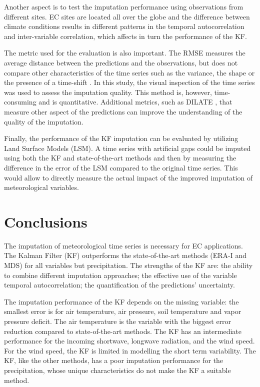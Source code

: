 \documentclass{article}
\let\Oldsection\section
\renewcommand{\section}{\FloatBarrier\Oldsection}
\begin{document}
Another aspect is to test the imputation performance using observations from different sites. EC sites are located all over the globe \cite{pastorello_fluxnet2015_2020} and the difference between climate conditions results in different patterns in the temporal autocorrelation and inter-variable correlation, which affects in turn the performance of the KF.

The metric used for the evaluation is also important. The RMSE measures the average distance between the predictions and the observations, but does not compare other characteristics of the time series such as the variance, the shape or the presence of a time-shift \cite{guen_shape_nodate}. In this study, the visual inspection of the time series was used to assess the imputation quality. This method is, however, time-consuming and is quantitative. Additional metrics, such as DILATE \cite{guen_shape_nodate}, that measure other aspect of the predictions can improve the understanding of the quality of the imputation.

Finally, the performance of the KF imputation can be evaluated by utilizing Land Surface Models (LSM). A time series with artificial gaps could be imputed using both the KF and state-of-the-art methods and then by measuring the difference in the error of the LSM compared to the original time series. This would allow to directly measure the actual impact of the improved imputation of meteorological variables.


\section{Conclusions}

The imputation of meteorological time series is necessary for EC applications. The Kalman Filter (KF) outperforms the state-of-the-art methods (ERA-I and MDS) for all variables but precipitation. The strengths of the KF are: the ability to combine different imputation approaches; the effective use of the variable temporal autocorrelation; the quantification of the predictions' uncertainty.

The imputation performance of the KF depends on the missing variable: the smallest error is for air temperature, air pressure, soil temperature and vapor pressure deficit. The air temperature is the variable with the biggest error reduction compared to state-of-the-art methods. The KF has an intermediate performance for the incoming shortwave, longwave radiation, and the wind speed. For the wind speed, the KF is limited in modelling the short term variability. The KF, like the other methods, has a poor imputation performance for the precipitation, whose unique characteristics do not make the KF a suitable method.
\end{document}
